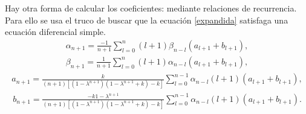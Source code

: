 \documentclass[11pt]{beamer}
\theoremstyle{definition}
\begin{document}
\begin{frame}

Hay otra forma de calcular los coeficientes: mediante relaciones de recurrencia. Para ello se usa el truco de buscar que la ecuación \eqref{expandida} satisfaga una ecuaci\'on diferencial simple.
\begin{eqnarray}
\alpha_{n+1}=\frac{-1}{n+1}\sum_{l=0}^{n}(l+1)\beta_{n-l}(a_{l+1}+b_{l+1}),
\label{recurrencia alpha}
\end{eqnarray}
\begin{eqnarray}
\beta_{n+1}=\frac{1}{n+1}\sum_{l=0}^{n}(l+1)\alpha_{n-l}(a_{l+1}+b_{l+1}),
\label{recurrencia beta}
\end{eqnarray}
\begin{eqnarray}
a_{n+1}=\frac{k}{(n+1)[(1-\lambda^{n+1})(1-\lambda^{n+1}+k)-k]}\sum_{l=0}^{n-1}\alpha_{n-l}(l+1)(a_{l+1}+b_{l+1}),
\end{eqnarray}
\begin{eqnarray}
b_{n+1}=\frac{-k 1-\lambda^{n+1}}{(n+1)[(1-\lambda^{n+1})(1-\lambda^{n+1}+k)-k]}\sum_{l=0}^{n-1}\alpha_{n-l}(l+1)(a_{l+1}+b_{l+1}).
\end{eqnarray}
\end{frame}


\end{document}

